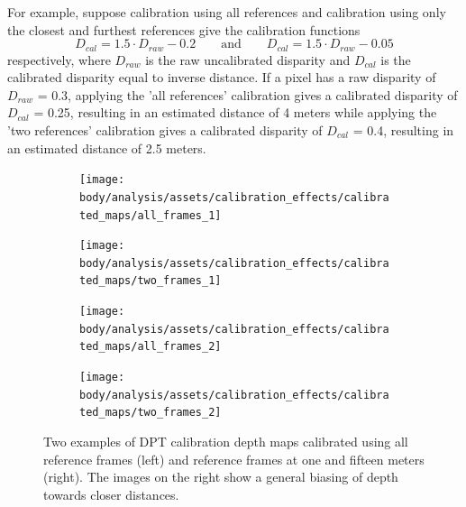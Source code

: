 For example, suppose calibration using all references and calibration using only the closest and furthest
references give the calibration functions
\[
    D_{cal} = 1.5 \cdot D_{raw} - 0.2
    \qquad \mathrm{and} \qquad
    D_{cal} = 1.5 \cdot D_{raw} - 0.05
\]
respectively, where $D_{raw}$ is the raw uncalibrated disparity and $D_{cal}$ is the calibrated disparity
equal to inverse distance.
If a pixel has a raw disparity of $D_{raw}$ = 0.3, applying the 'all references' calibration gives a
calibrated disparity of $D_{cal}$ = 0.25, resulting in an estimated distance of 4 meters while applying
the 'two references' calibration gives a calibrated disparity of $D_{cal}$ = 0.4, resulting in an
estimated distance of 2.5 meters.

\begin{figure}[htbp]
    \centering
    \begin{subfigure}[t]{0.48\textwidth}
        \centering
        \texttt{[image: body/analysis/assets/calibration\_effects/calibrated\_maps/all\_frames\_1]}
    \end{subfigure}
    \begin{subfigure}[t]{0.48\textwidth}
        \centering
        \texttt{[image: body/analysis/assets/calibration\_effects/calibrated\_maps/two\_frames\_1]}
    \end{subfigure}
    
    \vspace{5mm}

    \begin{subfigure}[t]{0.48\textwidth}
        \centering
        \texttt{[image: body/analysis/assets/calibration\_effects/calibrated\_maps/all\_frames\_2]}
    \end{subfigure}
    \begin{subfigure}[t]{0.48\textwidth}
        \centering
        \texttt{[image: body/analysis/assets/calibration\_effects/calibrated\_maps/two\_frames\_2]}
    \end{subfigure}

    \caption{Two examples of DPT calibration depth maps calibrated using all reference frames
        (left) and reference frames at one and fifteen meters (right). The images on the right
        show a general biasing of depth towards closer distances.}
    \label{fig:calibrated_maps}
\end{figure}







